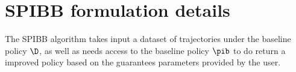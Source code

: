 \section{SPIBB formulation details}
\label{app:spibb-background}









The SPIBB algorithm \citep{laroche2017safe} takes input a dataset of trajectories under the baseline policy $\D$, as well as needs access to the baseline policy $\pib$ to do return a improved policy based on the guarantees parameters provided by the user.

